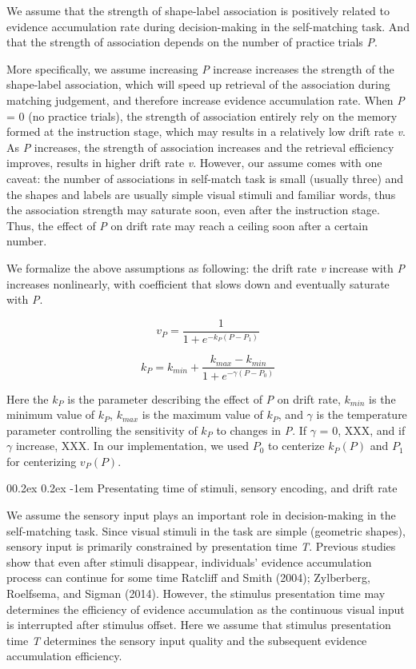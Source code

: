 \documentclass[
  english,
  man,floatsintext]{apa6}
\makeatletter
\let\oldparagraph\paragraph
\renewcommand{\paragraph}{
    \@ifstar
      \xxxParagraphStar
      \xxxParagraphNoStar
  }
\newcommand{\xxxParagraphStar}[1]{\oldparagraph*{#1}\mbox{}}
\newcommand{\xxxParagraphNoStar}[1]{\oldparagraph{#1}\mbox{}}
\renewcommand{\paragraph}{\@startsection{paragraph}{4}{\parindent}%
  {0\baselineskip \@plus 0.2ex \@minus 0.2ex}%
  {-1em}%
  {\normalfont\normalsize\bfseries\itshape\typesectitle}}
\makeatother
\begin{document}
We assume that the strength of shape-label association is positively related to evidence accumulation rate during decision-making in the self-matching task. And that the strength of association depends on the number of practice trials \emph{P}.

More specifically, we assume increasing \emph{P} increase increases the strength of the shape-label association, which will speed up retrieval of the association during matching judgement, and therefore increase evidence accumulation rate. When \emph{P} = 0 (no practice trials), the strength of association entirely rely on the memory formed at the instruction stage, which may results in a relatively low drift rate \emph{v}. As \emph{P} increases, the strength of association increases and the retrieval efficiency improves, results in higher drift rate \emph{v}. However, our assume comes with one caveat: the number of associations in self-match task is small (usually three) and the shapes and labels are usually simple visual stimuli and familiar words, thus the association strength may saturate soon, even after the instruction stage. Thus, the effect of \emph{P} on drift rate may reach a ceiling soon after a certain number.

We formalize the above assumptions as following: the drift rate \emph{v} increase with \emph{P} increases nonlinearly, with coefficient that slows down and eventually saturate with \emph{P}.

\[v_P = \frac{1}{1 + e^{-k_P(P - P_1)}}\]

\[k_P = k_{min} + \frac{k_{max} - k_{min}}{1 + e^{-\gamma(P - P_0)}}\]

Here the \(k_P\) is the parameter describing the effect of \emph{P} on drift rate, \(k_{min}\) is the minimum value of \(k_P\), \(k_{max}\) is the maximum value of \(k_P\), and \(\gamma\) is the temperature parameter controlling the sensitivity of \(k_P\) to changes in \emph{P}. If \(\gamma\) = 0, XXX, and if \(\gamma\) increase, XXX. In our implementation, we used \(P_0\) to centerize \(k_P(P)\) and \(P_1\) for centerizing \(v_P(P)\).

\paragraph{Presentating time of stimuli, sensory encoding, and drift rate}\label{presentating-time-of-stimuli-sensory-encoding-and-drift-rate}

We assume the sensory input plays an important role in decision-making in the self-matching task. Since visual stimuli in the task are simple (geometric shapes), sensory input is primarily constrained by presentation time \emph{T}. Previous studies show that even after stimuli disappear, individuals' evidence accumulation process can continue for some time Ratcliff and Smith (2004); Zylberberg, Roelfsema, and Sigman (2014). However, the stimulus presentation time may determines the efficiency of evidence accumulation as the continuous visual input is interrupted after stimulus offset. Here we assume that stimulus presentation time \emph{T} determines the sensory input quality and the subsequent evidence accumulation efficiency.
\end{document}
